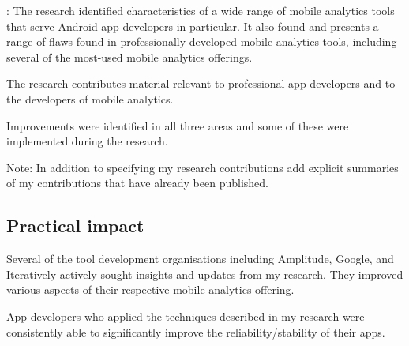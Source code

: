 :
The research identified characteristics of a wide range of mobile analytics tools that serve Android app developers in particular. It also found and  presents a range of flaws found in professionally-developed mobile analytics tools, including several of the most-used mobile analytics offerings.

The research contributes material relevant to professional app developers and to the developers of mobile analytics. 

Improvements were identified in all three areas and some of these were implemented during the research. 

Note: In addition to specifying my research contributions add explicit summaries of my contributions that have already been published.

\subsection{Practical impact}
Several of the tool development organisations including Amplitude, Google, and Iteratively actively sought insights and updates from my research. They improved various aspects of their respective mobile analytics offering.

App developers who applied the techniques described in my research were consistently able to significantly improve the reliability/stability of their apps.
